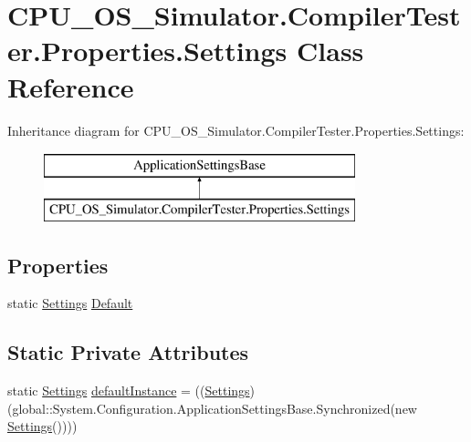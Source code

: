 \hypertarget{class_c_p_u___o_s___simulator_1_1_compiler_tester_1_1_properties_1_1_settings}{}\section{C\+P\+U\+\_\+\+O\+S\+\_\+\+Simulator.\+Compiler\+Tester.\+Properties.\+Settings Class Reference}
\label{class_c_p_u___o_s___simulator_1_1_compiler_tester_1_1_properties_1_1_settings}
Inheritance diagram for C\+P\+U\+\_\+\+O\+S\+\_\+\+Simulator.\+Compiler\+Tester.\+Properties.\+Settings\+:\begin{figure}[H]
\begin{center}
\leavevmode
\includegraphics[height=2.000000cm]{class_c_p_u___o_s___simulator_1_1_compiler_tester_1_1_properties_1_1_settings}
\end{center}
\end{figure}
\subsection*{Properties}
\begin{DoxyCompactItemize}
\item 
static \hyperlink{class_c_p_u___o_s___simulator_1_1_compiler_tester_1_1_properties_1_1_settings}{Settings} \hyperlink{class_c_p_u___o_s___simulator_1_1_compiler_tester_1_1_properties_1_1_settings_aee2389b8aff33117b4fe3a30d9440b3c}{Default}
\end{DoxyCompactItemize}
\subsection*{Static Private Attributes}
\begin{DoxyCompactItemize}
\item 
static \hyperlink{class_c_p_u___o_s___simulator_1_1_compiler_tester_1_1_properties_1_1_settings}{Settings} \hyperlink{class_c_p_u___o_s___simulator_1_1_compiler_tester_1_1_properties_1_1_settings_ace8d8c1dcebb413495929aa337d5ddd5}{default\+Instance} = ((\hyperlink{class_c_p_u___o_s___simulator_1_1_compiler_tester_1_1_properties_1_1_settings}{Settings})(global\+::\+System.\+Configuration.\+Application\+Settings\+Base.\+Synchronized(new \hyperlink{class_c_p_u___o_s___simulator_1_1_compiler_tester_1_1_properties_1_1_settings}{Settings}())))
\end{DoxyCompactItemize}


